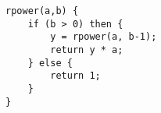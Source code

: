 \begin{lstlisting}
rpower(a,b) {
    if (b > 0) then {
        y = rpower(a, b-1);
        return y * a;
    } else {
        return 1;
    }
}
\end{lstlisting}
